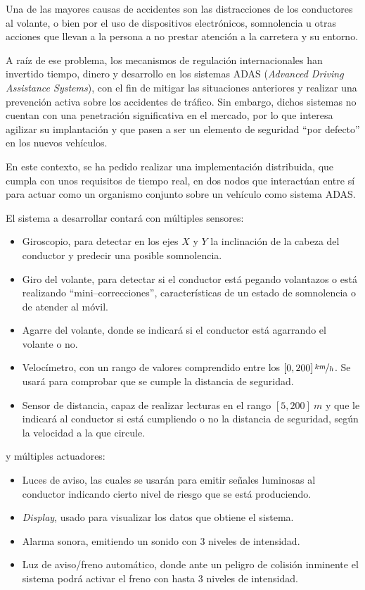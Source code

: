 Una de las mayores causas de accidentes son las distracciones de los conductores
al volante, o bien por el uso de dispositivos electrónicos, somnolencia u otras
acciones que llevan a la persona a no prestar atención a la carretera y su entorno.

A raíz de ese problema, los mecanismos de regulación internacionales han invertido
tiempo, dinero y desarrollo en los sistemas ADAS (\textit{Advanced Driving Assistance Systems}),
con el fin de mitigar las situaciones anteriores y realizar una prevención activa
sobre los accidentes de tráfico. Sin embargo, dichos sistemas no cuentan con una
penetración significativa en el mercado, por lo que interesa agilizar su implantación
y que pasen a ser un elemento de seguridad ``por defecto'' en los nuevos vehículos.

En este contexto, se ha pedido realizar una implementación distribuida, que cumpla con
unos requisitos de tiempo real, en dos nodos que interactúan entre sí para actuar
como un organismo conjunto sobre un vehículo como sistema ADAS.

El sistema a desarrollar contará con múltiples sensores:
\begin{itemize}
  \item Giroscopio, para detectar en los ejes $X$ y $Y$ la inclinación de la cabeza
        del conductor y predecir una posible somnolencia.
  \item Giro del volante, para detectar si el conductor está pegando volantazos o está
        realizando ``mini--correcciones'', características de un estado de somnolencia o
        de atender al móvil.
  \item Agarre del volante, donde se indicará si el conductor está agarrando el volante
        o no.
  \item Velocímetro, con un rango de valores comprendido entre los
        $\left[0, 200\right] \nicefrac{km}{h}$. Se usará para comprobar que se cumple
        la distancia de seguridad.
  \item Sensor de distancia, capaz de realizar lecturas en el rango $\left[5, 200\right]~m$
        y que le indicará al conductor si está cumpliendo o no la distancia de seguridad,
        según la velocidad a la que circule.
\end{itemize}

y múltiples actuadores:
\begin{itemize}
  \item Luces de aviso, las cuales se usarán para emitir señales luminosas al conductor
        indicando cierto nivel de riesgo que se está produciendo.
  \item \textit{Display}, usado para visualizar los datos que obtiene el sistema.
  \item Alarma sonora, emitiendo un sonido con 3 niveles de intensidad.
  \item Luz de aviso/freno automático, donde ante un peligro de colisión inminente
        el sistema podrá activar el freno con hasta 3 niveles de intensidad.
\end{itemize}

